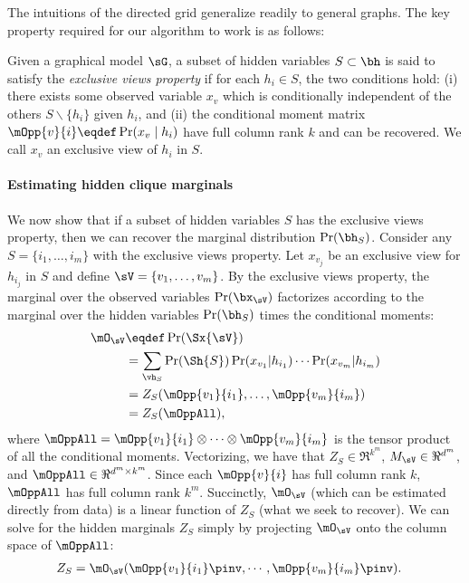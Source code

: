 The intuitions of the directed grid generalize readily to general graphs.
The key property required for our algorithm to work is as follows:
\begin{property}
  \label{prop:exclusive-views}
Given a graphical model $\sG$,
  a subset of hidden variables $S \subset \bh$ is said to satisfy the \emph{exclusive views property} if for
  each $h_i \in S$, the two conditions hold:
  (i) there exists some observed variable
  $x_{v}$ which is conditionally independent of the others $S \backslash \{ h_i \}$ given $h_i$,
  and (ii) the conditional moment matrix $\mOpp{v}{i} \eqdef
  \Pr(x_{v} \mid h_i)$ have full column rank $k$ and can be recovered.
We call $x_v$ an exclusive view of $h_i$ in $S$.
\end{property}

\paragraph{Estimating hidden clique marginals}

We now show that if a subset of hidden variables $S$ has the exclusive views property,
then we can recover the marginal distribution $\Pr(\bh_S)$.
Consider any $S = \{i_1, \ldots, i_m\}$ with the exclusive views property. Let
  $x_{v_j}$ be an exclusive view for $h_{i_j}$ in $S$ and define $\sV
  = \{v_1, \ldots, v_m\}$. %
By the exclusive views property,
the marginal over the observed variables $\Pr(\bx_\sV)$
factorizes according to the marginal over the hidden variables $\Pr(\bh_S)$
times the conditional moments:
\begin{align*}
  \mO_\sV 
  &\eqdef \Pr(\Sx{\sV}) \\
  &= \sum_{\vh_S} \Pr(\Sh{S}) 
                    \Pr(x_{v_1} | h_{i_1}) \cdots \Pr(x_{v_m} | h_{i_m}) \\
  &= Z_{S}(\mOpp{v_1}{i_1},\dots,\mOpp{v_m}{i_m}) \\
  &= Z_{S}(\mOppAll),
\end{align*}
where $\mOppAll = \mOpp{v_1}{i_1} \otimes \cdots \otimes \mOpp{v_m}{i_m}$ is the tensor product of
all the conditional moments.
Vectorizing, we have that
$Z_S \in \Re^{k^m}$,
$M_\sV \in \Re^{d^m}$,
and $\mOppAll \in \Re^{d^m \times k^m}$.
Since each $\mOpp{v}{i}$ has full column rank $k$,
$\mOppAll$ has full column rank $k^m$.
Succinctly, $\mO_\sV$ (which can be estimated directly from data)
is a linear function of $Z_S$ (what we seek to recover).
We can solve for the hidden marginals $Z_S$ simply by projecting $\mO_\sV$ onto the column
space of $\mOppAll$:
\begin{align*}
  Z_{S} &= \mO_\sV(\mOpp{v_1}{i_1}\pinv,\cdots,\mOpp{v_m}{i_m}\pinv).
\end{align*}

